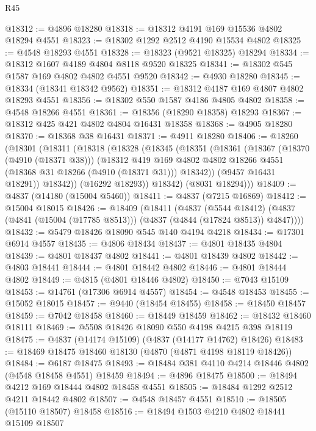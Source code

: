 \begin{lexlean}{R45}
\begin{coremodule}
@18312 := @4896 @18280
@18318 := @18312 @4191 @169 @15536 @4802 @18294 @4551
@18323 := @18302 @1292 @2512 @4190 @15534 @4802
@18325 := @4548 @18293 @4551
@18328 := @18323 (@9521 @18325) @18294
@18334 := @18312 @1607 @4189 @4804 @8118 @9520 @18325
@18341 := @18302 @545 @1587 @169 @4802 @4802 @4551 @9520
@18342 := @4930 @18280
@18345 := @18334 (@18341 @18342 @9562)
@18351 := @18312 @4187 @169 @4807 @4802 @18293 @4551
@18356 := @18302 @550 @1587 @4186 @4805 @4802
@18358 := @4548 @18266 @4551
@18361 := @18356 (@18290 @18358) @18293
@18367 := @18312 @425 @421 @4802 @4804 @16431 @18358
@18368 := @4905 @18280
@18370 := @18368 @38 @16431
@18371 := @4911 @18280
@18406 := @18260
    (@18301
      (@18311
        (@18318
          (@18328
            (@18345
              (@18351
                (@18361
                  (@18367
                    (@18370 (@4910 (@18371 @38)))
                    (@18312
                      @419
                      @169
                      @4802
                      @4802
                      @18266
                      @4551
                      (@18368 @31 @18266 (@4910 (@18371 @31)))
                      @18342))
                  (@9457 @16431 @18291))
                @18342))
            (@16292 @18293))
          @18342)
        (@8031 @18294)))
@18409 := @4837 (@14180 (@15004 @5460))
@18411 := @4837 (@7215 @16869)
@18412 := @15004 @18015
@18426 := @18409
    (@18411
      (@4837
        (@5544 @18412)
        (@4837 (@4841 (@15004 (@17785 @8513))) (@4837 (@4844 (@17824 @8513)) @4847))))
@18432 := @5479 @18426 @18090 @545 @140 @4194 @4218
@18434 := @17301 @6914 @4557
@18435 := @4806 @18434
@18437 := @4801 @18435 @4804
@18439 := @4801 @18437 @4802
@18441 := @4801 @18439 @4802
@18442 := @4803 @18441
@18444 := @4801 @18442 @4802
@18446 := @4801 @18444 @4802
@18449 := @4815 (@4801 @18446 @4802)
@18450 := @7043 @15109
@18453 := @14761 (@17306 @6914 @4557)
@18454 := @4548 @18453
@18455 := @15052 @18015
@18457 := @9440 (@18454 @18455)
@18458 := @18450 @18457
@18459 := @7042 @18458
@18460 := @18449 @18459
@18462 := @18432 @18460 @18111
@18469 := @5508 @18426 @18090 @550 @4198 @4215 @398 @18119
@18475 := @4837 (@14174 @15109) (@4837 (@14177 @14762) @18426)
@18483 := @18469 @18475 @18460 @18130 (@4870 (@4871 @4198 @18119 @18426))
@18484 := @6187 @18475
@18493 := @18484 @381 @4110 @4214 @18446 @4802 (@4548 @18458 @4551) @18459
@18494 := @4896 @18475
@18500 := @18494 @4212 @169 @18444 @4802 @18458 @4551
@18505 := @18484 @1292 @2512 @4211 @18442 @4802
@18507 := @4548 @18457 @4551
@18510 := @18505 (@15110 @18507) @18458
@18516 := @18494 @1503 @4210 @4802 @18441 @15109 @18507

\end{coremodule}
\end{lexlean}
